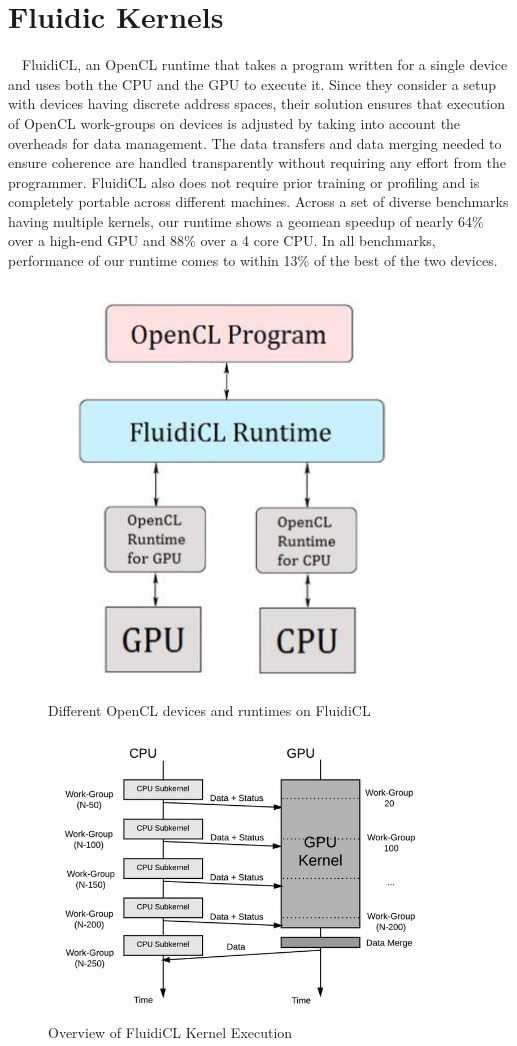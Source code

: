 \section{Fluidic Kernels}
\quad \ \ FluidiCL\cite{FluidicCL}, an OpenCL\cite{OpenCLWeb} runtime that takes a program written for a single device and uses both the CPU and the GPU to execute it. Since they consider a setup with devices having discrete address spaces, their solution ensures that execution of OpenCL work-groups on devices is adjusted by taking into account the overheads for data management. The data transfers and data merging needed to ensure coherence are handled transparently without requiring any effort from the programmer. FluidiCL also does not require prior training or profiling and is completely portable across different machines. Across a set of diverse benchmarks having multiple kernels, our runtime shows a geomean speedup of nearly 64\% over a high-end GPU and 88\% over a 4 core CPU. In all benchmarks, performance of our runtime comes to within 13\% of the best of the two devices.
\begin{figure}[H]
\centering
\includegraphics[width=10cm]{img/FluidiCLArch.png}
\caption{Different OpenCL devices and runtimes on FluidiCL}
\label{fig:my_label}
\end{figure}

\begin{figure}[H]
\centering
\includegraphics[width=10cm]{img/FluidiCLKernelExecution.png}
\caption{Overview of FluidiCL Kernel Execution}
\label{fig:my_label}
\end{figure}
